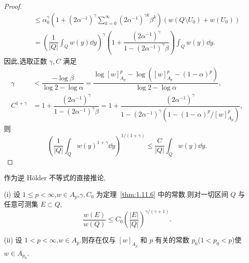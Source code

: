 \begin{proof}
\begin{align*}
\qquad &\leq \alpha_{0}^{\gamma}\left(1 + (2\alpha^{-1})^{\gamma}\sum_{k=0}^{\infty}(2\alpha^{-1})^{\gamma k}\beta^{k}\right)\left(w(Q \setminus U_{0}) + w(U_{0})\right) \\
\qquad &= \left(\dfrac{1}{|Q|}\displaystyle\int_{Q}w(y)\dd y\right)^{\gamma}\left(1 + \dfrac{(2\alpha^{-1})^{\gamma}}{1 - (2\alpha^{-1})^{\gamma}\beta}\right)\int_{Q}w(y)\dd y.
\end{align*}
因此,选取正数 $\gamma, C$ 满足
\begin{align*}
\gamma &< \dfrac{-\log\beta}{\log 2 - \log\alpha} = \dfrac{\log[w]_{A_{p}}^{p} - \log\left([w]_{A_{p}}^{p} - (1 - \alpha)^{p}\right)}{\log 2 - \log\alpha}, \\
C^{1+\gamma} &= 1 + \dfrac{(2\alpha^{-1})^{\gamma}}{1 - (2\alpha^{-1})^{\gamma}\beta} = 1 + \dfrac{(2\alpha^{-1})^{\gamma}}{1 - (2\alpha^{-1})^{\gamma}\left(1 - (1 - \alpha)^{p}/[w]_{A_{p}}^{p}\right)},
\end{align*}
则
\begin{equation*}
\left(\frac{1}{|Q|}\int_{Q}w(y)^{1+\gamma}\dd y\right)^{1/(1+\gamma)} \leq \frac{C}{|Q|}\int_{Q}w(y)\dd y.
\end{equation*}
\end{proof}

作为逆 Hölder 不等式的直接推论,

\begin{lemma}\label{lem:1.11.7}
(i) 设 $1 \leq p < \infty$,$w \in A_{p}$,$\gamma, C_{0}$ 为定理~\ref{thm:1.11.6} 中的常数.则对一切区间 $Q$ 与任意可测集 $E \subset Q$,
\begin{equation*}
\frac{w(E)}{w(Q)} \leq C_{0}\left(\frac{|E|}{|Q|}\right)^{\gamma/(\gamma+1)}.
\end{equation*}

(ii) 设 $1 < p < \infty$,$w \in A_{p}$.则存在仅与 $[w]_{A_{p}}$ 和 $p$ 有关的常数 $p_{0}$($1 < p_{0} < p$)使 $w \in A_{p_{0}}$.
\end{lemma}

